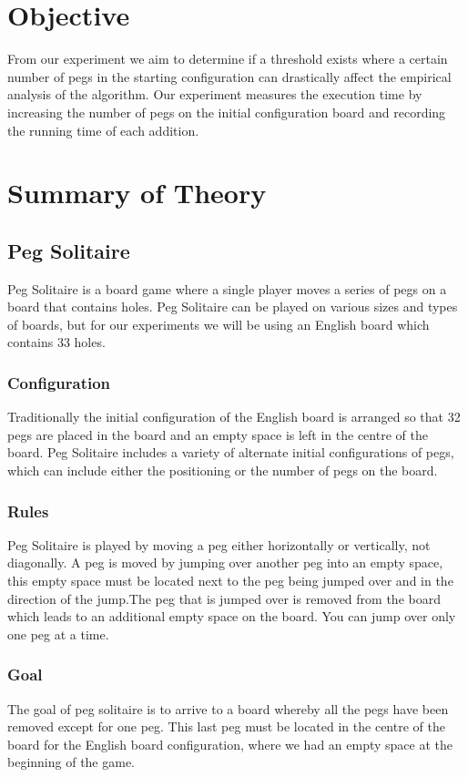 \documentclass{article}
\begin{document}
\section{Objective}
From our experiment we aim to determine if a threshold exists where a certain number of pegs in the starting configuration can drastically affect the empirical analysis of the algorithm. Our experiment measures the execution time by increasing the number of pegs on the initial configuration board and recording the running time of each addition.


\section{Summary of Theory}
\subsection{Peg Solitaire}
Peg Solitaire is a board game where a single player moves a series of pegs on a board that contains holes. Peg Solitaire can be played on various sizes and types of boards, but for our experiments we will be using an English board which contains 33 holes.
\subsubsection{Configuration}
Traditionally the initial configuration of the English board is arranged so that 32 pegs are placed in the board and an empty space is left in the centre of the board. Peg Solitaire includes a variety of alternate initial configurations of pegs, which can include either the positioning or the number of pegs on the board.   
\subsubsection{Rules}
Peg Solitaire is played by moving a peg either horizontally or vertically, not diagonally. A peg is moved by jumping over another peg into an empty space, this empty space must be located next to the peg being jumped over and in the direction of the jump.The peg that is jumped over is removed from the board which leads to an additional empty space on the board. You can jump over only one peg at a time.
\subsubsection{Goal}
The goal of peg solitaire is to arrive to a board whereby all the pegs have been removed except for one peg. This last peg must be located in the centre of the board for the English board configuration, where we had an empty space at the beginning of the game.
 
\end{document}
